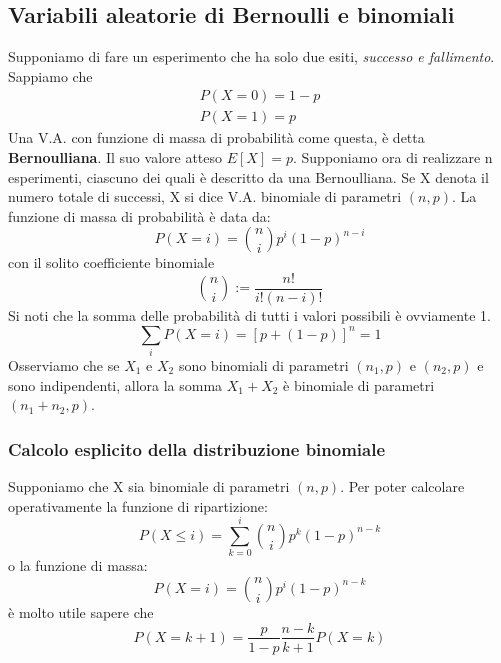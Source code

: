 \documentclass[11pt]{article}
\begin{document}
\subsection{Variabili aleatorie di Bernoulli e binomiali}
Supponiamo di fare un esperimento che ha solo due esiti, \textit{successo e fallimento}. Sappiamo che
\begin{gather*}
    P(X=0)=1-p\\ 
    P(X=1)=p
\end{gather*}
Una V.A. con funzione di massa di probabilità come questa, è detta \textbf{Bernoulliana}. Il suo valore atteso $E[X] = p$.
Supponiamo ora di realizzare n esperimenti, ciascuno dei quali è descritto da una Bernoulliana. Se X denota il numero totale di successi, X si dice V.A. binomiale di parametri $(n,p)$. La funzione di massa di probabilità è data da:
\begin{displaymath}
    P(X=i)={n \choose i} p^i(1-p)^{n-i}
\end{displaymath}
con il solito coefficiente binomiale
\begin{displaymath}
    {n \choose i} := \frac{n!}{i!(n-i)!}
\end{displaymath}
Si noti che la somma delle probabilità di tutti i valori possibili è ovviamente 1.
\begin{displaymath}
    \sum_iP(X=i)=[p+(1-p)]^n=1
\end{displaymath}
Osserviamo che se $X_1$ e $X_2$ sono binomiali di parametri $(n_1,p)$ e $(n_2,p)$ e sono indipendenti, allora la somma $X_1+X_2$ è binomiale di parametri $(n_1+n_2,p)$.
\subsubsection{Calcolo esplicito della distribuzione binomiale}
Supponiamo che X sia binomiale di parametri $(n,p)$. Per poter calcolare operativamente la funzione di ripartizione:
\begin{displaymath}
    P(X\le i) = \sum_{k=0}^i {n \choose i} p^k (1-p)^{n-k}
\end{displaymath}
o la funzione di massa:
\begin{displaymath}
    P(X=i) = {n \choose i} p^i(1-p)^{n-k}
\end{displaymath}
è molto utile sapere che 
\begin{displaymath}
    P(X=k+1)=\frac{p}{1-p}\frac{n-k}{k+1}P(X=k)
\end{displaymath}
\end{document}
